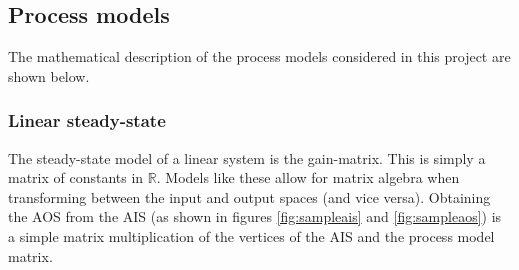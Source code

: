 \subsection{Process models}
The mathematical description of the process models considered in this project are shown below.
\subsubsection{Linear steady-state}
The steady-state model of a linear system is the gain-matrix.
This is simply a matrix of constants in $\mathbb{R}$.
Models like these allow for matrix algebra when transforming between the input and output spaces (and vice versa).
Obtaining the AOS from the AIS (as shown in figures \ref{fig:sampleais} and \ref{fig:sampleaos}) is a simple matrix multiplication of the vertices of the AIS and the process model matrix.

